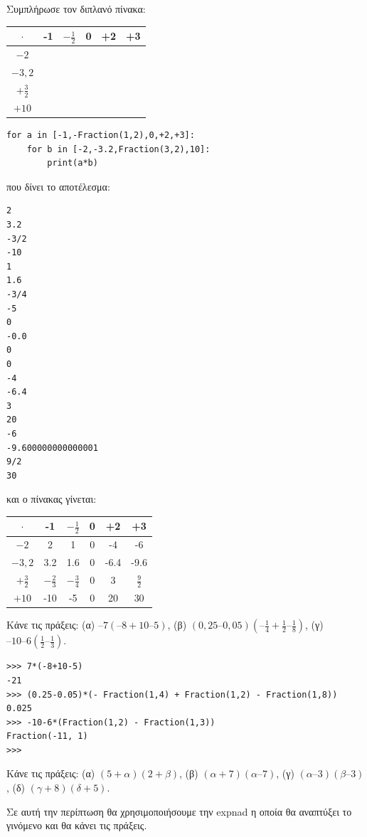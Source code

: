 \begin{exercise}
Συμπλήρωσε τον διπλανό πίνακα:
\begin{table}[h]
\begin{tabular}{|c|c|c|c|c|c|}
\hline
$\cdot$&-1&$-\frac{1}{2}$&0&+2&+3\\\hline
$-2$&&&&&\\\hline
$-3,2$&&&&&\\\hline
$+\frac{3}{2}$&&&&&\\\hline
$+10$&&&&&\\\hline
\end{tabular}
\end{table}
\end{exercise}
\begin{lstlisting}
for a in [-1,-Fraction(1,2),0,+2,+3]:
    for b in [-2,-3.2,Fraction(3,2),10]:
        print(a*b)
\end{lstlisting}
που δίνει το αποτέλεσμα:
\begin{lstlisting}
2
3.2
-3/2
-10
1
1.6
-3/4
-5
0
-0.0
0
0
-4
-6.4
3
20
-6
-9.600000000000001
9/2
30
\end{lstlisting}
και ο πίνακας γίνεται:
\begin{table}[h]
\begin{tabular}{|c|c|c|c|c|c|}
\hline
$\cdot$&-1&$-\frac{1}{2}$&0&+2&+3\\\hline
$-2$&2&1&0&-4&-6\\\hline
$-3,2$&3.2&1.6&0&-6.4&-9.6\\\hline
$+\frac{3}{2}$&$-\frac{2}{3}$&$-\frac{3}{4}$&0&3&$\frac{9}{2}$\\\hline
$+10$&-10&-5&0&20&30\\\hline
\end{tabular}
\end{table}
\begin{exercise}
Κάνε	τις	πράξεις:	(α)	$–7(–8+10–5)$,	(β)	$(0,25–0,05)(– \frac{1}{4} + \frac{1}{2} – \frac{1}{8} )$,		(γ)$–10–6( \frac{1}{2} – \frac{1}{3})$.
\end{exercise}
\begin{lstlisting}
>>> 7*(-8+10-5)
-21
>>> (0.25-0.05)*(- Fraction(1,4) + Fraction(1,2) - Fraction(1,8))
0.025
>>> -10-6*(Fraction(1,2) - Fraction(1,3))
Fraction(-11, 1)
>>>
\end{lstlisting}
\begin{exercise}
Κάνε	τις	πράξεις:	(α)	$(5+α)(2+β)$,		(β)	$(α+7)(α–7)$,		(γ)	$(α–3)(β–3)$,		(δ)	$(γ+8)(δ+5)$.
\end{exercise}
Σε αυτή την περίπτωση θα χρησιμοποιήσουμε την expnad η οποία θα αναπτύξει το γινόμενο και θα κάνει τις πράξεις.
